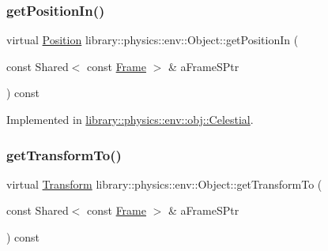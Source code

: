 \mbox{\label{classlibrary_1_1physics_1_1env_1_1_object_acc86d12ad94de870fc2684f7b768b617}} 
\subsubsection{\texorpdfstring{get\+Position\+In()}{getPositionIn()}}
{\footnotesize\ttfamily virtual \hyperlink{classlibrary_1_1physics_1_1coord_1_1_position}{Position} library\+::physics\+::env\+::\+Object\+::get\+Position\+In (\begin{DoxyParamCaption}\item[{const Shared$<$ const \hyperlink{classlibrary_1_1physics_1_1coord_1_1_frame}{Frame} $>$ \&}]{a\+Frame\+S\+Ptr }\end{DoxyParamCaption}) const\hspace{0.3cm}{\ttfamily [pure virtual]}}



Implemented in \hyperlink{classlibrary_1_1physics_1_1env_1_1obj_1_1_celestial_aa2a209f37414e24303c21d994396664f}{library\+::physics\+::env\+::obj\+::\+Celestial}.

\mbox{\label{classlibrary_1_1physics_1_1env_1_1_object_abe850e2334c19ae185456cd52aeeca7d}} 
\subsubsection{\texorpdfstring{get\+Transform\+To()}{getTransformTo()}}
{\footnotesize\ttfamily virtual \hyperlink{classlibrary_1_1physics_1_1coord_1_1_transform}{Transform} library\+::physics\+::env\+::\+Object\+::get\+Transform\+To (\begin{DoxyParamCaption}\item[{const Shared$<$ const \hyperlink{classlibrary_1_1physics_1_1coord_1_1_frame}{Frame} $>$ \&}]{a\+Frame\+S\+Ptr }\end{DoxyParamCaption}) const\hspace{0.3cm}{\ttfamily [pure virtual]}}



